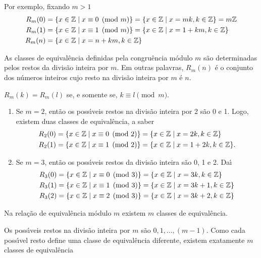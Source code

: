 Por exemplo, fixando $m > 1$
\begin{align*}
	R_{m}(0) &= \{x \in \mathbb{Z} \mid x\equiv 0 \pmod{m}\}=\{x\in \mathbb{Z} \mid x = mk, k\in\mathbb{Z}\}=m\mathbb{Z}\\
	R_{m}(1) &= \{x\in\mathbb{Z} \mid x\equiv 1 \pmod{m}\}=\{x\in\mathbb{Z} \mid x = 1 + km, k\in\mathbb{Z}\}\\
	R_{m}(n) &= \{x\in\mathbb{Z} \mid x = n + km, k\in\mathbb{Z}\}
\end{align*}

\begin{proposicao}
	As classes de equival{\^e}ncia definidas pela congru{\^e}ncia m{\'o}dulo $m$ s{\~a}o determinadas pelos restos da divis{\~a}o inteira por $m$. Em outras palavras, $R_{m}(n)$ {\'e} o conjunto dos n{\'u}meros inteiros cujo resto na divis{\~a}o inteira por $m$ {\'e} $n$.
\end{proposicao}

\begin{corolario}
	$R_{m}(k) = R_{m}(l)$ se, e somente se, $k\equiv l \pmod{m}$.
\end{corolario}

\begin{exemplos}
	\begin{enumerate}[label={\arabic*})]
		\item Se $m=2$, ent{\~a}o os poss{\'\i}veis restos na divis{\~a}o inteira por 2 s{\~a}o 0 e 1. Logo, existem duas classes de equival{\^e}ncia, a saber
		\begin{align*}
			R_{2}(0) &= \{x \in \mathbb{Z} \mid x\equiv 0 \pmod{2}\} = \{x\in \mathbb{Z} \mid x = 2k, k\in\mathbb{Z}\}\\
			R_{2}(1) &= \{x\in\mathbb{Z} \mid x\equiv 1 \pmod{2}\} = \{x\in\mathbb{Z} \mid x = 1 + 2k, k\in\mathbb{Z}\}.
		\end{align*}
		
		\item Se $m = 3$, ent{\~a}o os poss{\'\i}veis restos da divis{\~a}o inteira s{\~a}o 0, 1 e 2. Da{\'\i}
		\begin{align*}
			R_{3}(0) &= \{x \in \mathbb{Z} \mid x\equiv 0 \pmod{3}\} = \{x\in \mathbb{Z} \mid x = 3k, k \in \mathbb{Z}\}\\
			R_{3}(1) & = \{x \in \mathbb{Z} \mid x\equiv 1 \pmod{3}\} = \{x\in\mathbb{Z} \mid x = 3k + 1, k \in \mathbb{Z}\}\\
			R_{3}(2) &= \{x \in \mathbb{Z} \mid x\equiv 2 \pmod{3}\} = \{x\in\mathbb{Z} \mid x = 3k + 2, k \in \mathbb{Z}\}
		\end{align*}
	\end{enumerate}	
\end{exemplos}

\begin{proposicao}
	Na rela{\c c}{\~a}o de equival{\^e}ncia m{\'o}dulo $m$ existem $m$ classes de equival{\^e}ncia.
\end{proposicao}
\begin{prova}
	Os poss{\'\i}veis restos na divis{\~a}o inteira por $m$ s{\~a}o $0,1,...,(m-1)$. Como cada poss{\'\i}vel resto define uma classe de equival{\^e}ncia diferente, existem exatamente $m$ classes de equival{\^e}ncia
\end{prova}

